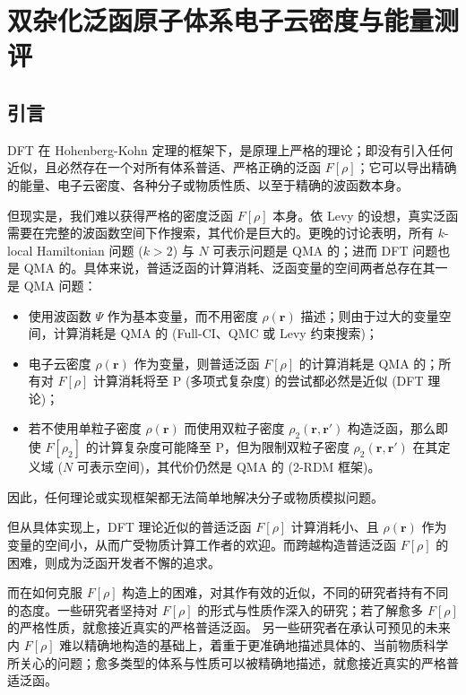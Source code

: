
\chapter{双杂化泛函原子体系电子云密度与能量测评}
\label{sec.4.title}

\section{引言}

DFT 在 Hohenberg-Kohn 定理\cite{Hohenberg-Kohn.PR.1964}的框架下，是原理上严格的理论；即没有引入任何近似，且必然存在一个对所有体系普适、严格正确的泛函 $F[\rho]$；它可以导出精确的能量、电子云密度、各种分子或物质性质、以至于精确的波函数本身。

但现实是，我们难以获得严格的密度泛函 $F[\rho]$ 本身。依 Levy 的设想\cite{Levy-Levy.PNAS.1979}，真实泛函需要在完整的波函数空间下作搜索，其代价是巨大的。更晚的讨论表明，所有 $k$-local Hamiltonian 问题 ($k > 2$) 与 $N$ 可表示问题是 QMA 的\cite{Kempe-Regev.SJC.2006, Liu-Verstraete.PRL.2007}；进而 DFT 问题也是 QMA 的\cite{Schuch-Verstraete.NP.2009}。具体来说，普适泛函的计算消耗、泛函变量的空间两者总存在其一是 QMA 问题：
\begin{itemize}[nosep]
    \item 使用波函数 $\Psi$ 作为基本变量，而不用密度 $\rho(\bm{r})$ 描述；则由于过大的变量空间，计算消耗是 QMA 的 (Full-CI、QMC 或 Levy 约束搜索)；
    \item 电子云密度 $\rho(\bm{r})$ 作为变量，则普适泛函 $F[\rho]$ 的计算消耗是 QMA 的；所有对 $F[\rho]$ 计算消耗将至 P (多项式复杂度) 的尝试都必然是近似 (DFT 理论)；
    \item 若不使用单粒子密度 $\rho(\bm{r})$ 而使用双粒子密度 $\rho_2(\bm{r}, \bm{r}')$ 构造泛函，那么即使 $F[\rho_2]$ 的计算复杂度可能降至 P，但为限制双粒子密度 $\rho_2 (\bm{r}, \bm{r}')$ 在其定义域 ($N$ 可表示空间)，其代价仍然是 QMA 的 (2-RDM 框架)。
\end{itemize}
因此，任何理论或实现框架都无法简单地解决分子或物质模拟问题。

但从具体实现上，DFT 理论近似的普适泛函 $F[\rho]$ 计算消耗小、且 $\rho(\bm{r})$ 作为变量的空间小，从而广受物质计算工作者的欢迎。而跨越构造普适泛函 $F[\rho]$ 的困难，则成为泛函开发者不懈的追求。

而在如何克服 $F[\rho]$ 构造上的困难，对其作有效的近似，不同的研究者持有不同的态度。一些研究者坚持对 $F[\rho]$ 的形式与性质作深入的研究；若了解愈多 $F[\rho]$ 的严格性质，就愈接近真实的严格普适泛函\cite{Kohn-Sham.PR.1965, Slater-Slater.PR.1951, Vosko-Nusair.CJP.1980, Perdew-Ernzerhof.PRL.1996, Adamo-Barone.JCP.1999, Ernzerhof-Scuseria.JCP.1999, Tao-Scuseria.PRL.2003, Cohen-Yang.CR.2012, Su-Xu.JCP.2014, Sun-Perdew.PRL.2015, Medvedev-Lyssenko.S.2017}。
另一些研究者在承认可预见的未来内 $F[\rho]$ 难以精确地构造的基础上，着重于更准确地描述具体的、当前物质科学所关心的问题；愈多类型的体系与性质可以被精确地描述，就愈接近真实的严格普适泛函\cite{Becke-Becke.PRA.1988, Lee-Parr.PRB.1988, Becke-Becke.JCP.1993, Zhao-Truhlar.JCP.2006, Grimme-Grimme.JCP.2006, Zhao-Truhlar.TCA.2008, Zhang-Goddard.PNAS.2009, Chai-Head-Gordon.JCP.2009, Zhang-Goddard.PNAS.2011, Zhang-Xu.JCP.2012, Yu-Truhlar.JCP.2016, Chen-Weinan.JCTC.2021}。

